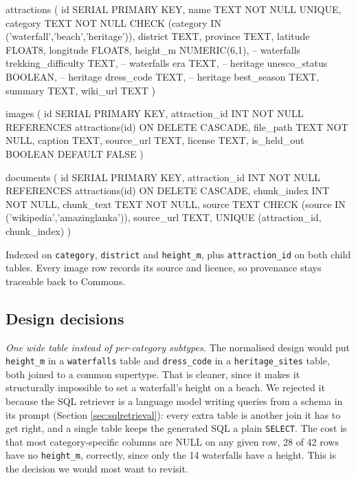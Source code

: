 \documentclass[11pt,a4paper]{article}
\newcommand{\code}[1]{\texttt{\small #1}}
\begin{document}
\begin{codeblock}
attractions (
    id SERIAL PRIMARY KEY,
    name TEXT NOT NULL UNIQUE,
    category TEXT NOT NULL CHECK (category IN ('waterfall','beach','heritage')),
    district TEXT, province TEXT, latitude FLOAT8, longitude FLOAT8,
    height_m NUMERIC(6,1),        -- waterfalls
    trekking_difficulty TEXT,     -- waterfalls
    era TEXT,                     -- heritage
    unesco_status BOOLEAN,        -- heritage
    dress_code TEXT,              -- heritage
    best_season TEXT, summary TEXT, wiki_url TEXT
)

images (
    id SERIAL PRIMARY KEY,
    attraction_id INT NOT NULL REFERENCES attractions(id) ON DELETE CASCADE,
    file_path TEXT NOT NULL, caption TEXT,
    source_url TEXT, license TEXT, is_held_out BOOLEAN DEFAULT FALSE
)

documents (
    id SERIAL PRIMARY KEY,
    attraction_id INT NOT NULL REFERENCES attractions(id) ON DELETE CASCADE,
    chunk_index INT NOT NULL, chunk_text TEXT NOT NULL,
    source TEXT CHECK (source IN ('wikipedia','amazinglanka')), source_url TEXT,
    UNIQUE (attraction_id, chunk_index)
)
\end{codeblock}

Indexed on \code{category}, \code{district} and \code{height\_m}, plus
\code{attraction\_id} on both child tables. Every image row records its
source and licence, so provenance stays traceable back to Commons.

\subsection{Design decisions}

\textit{One wide table instead of per-category subtypes.} The normalised
design would put \code{height\_m} in a \code{waterfalls} table and
\code{dress\_code} in a \code{heritage\_sites} table, both joined to a common
supertype. That is cleaner, since it makes it structurally impossible to set a
waterfall's height on a beach. We rejected it because the SQL retriever is a
language model writing queries from a schema in its prompt
(Section \ref{sec:sqlretrieval}): every extra table is another join it has to
get right, and a single table keeps the generated SQL a plain
\code{SELECT}. The cost is that most category-specific columns are NULL on any
given row, 28 of 42 rows have no \code{height\_m}, correctly, since only the 14
waterfalls have a height. This is the decision we would most want to revisit.
\end{document}
